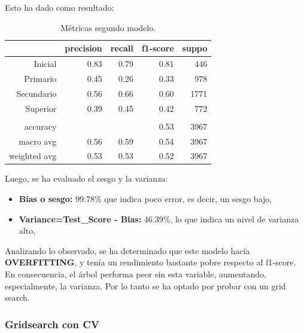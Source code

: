 \documentclass[a4paper]{article}
\begin{document}
            Esto ha dado como resultado:  

            \begin{table}[H]
                \centering
                \begin{tabular}{rrrrr}
                    \toprule
                    ~ & precision & recall & f1-score & suppo \\ \midrule
                    Inicial    & 0.83 & 0.79 & 0.81 & 446 \\
                    Primario   & 0.45 & 0.26 & 0.33 & 978 \\
                    Secundario & 0.56 & 0.66 & 0.60 & 1771 \\
                    Superior   & 0.39 & 0.45 & 0.42 & 772 \\
                    & & & & \\
                    accuracy & & & 0.53 & 3967 \\
                    macro avg & 0.56 & 0.59 & 0.54 & 3967 \\
                    weighted avg & 0.53 & 0.53 & 0.52 & 3967 \\
                    \bottomrule
                \end{tabular}
                \caption{Métricas segundo modelo.}
                \label{Second model metrics}
            \end{table}

            Luego, se ha evaluado el sesgo y la varianza:
            \begin{itemize}
                \item \textbf{Bias o sesgo:} 99.78\% que indica poco error, es decir, un sesgo bajo,
                \item \textbf{Variance=Test\_Score - Bias:} 46.39\%, lo que indica un nivel de varianza alto,
            \end{itemize}
            
            Analizando lo observado, se ha determinado que este modelo hacía \textbf{OVERFITTING}, y tenía un rendimiento bastante pobre respecto al f1-score. En consecuencia, el árbol performa peor sin esta variable, aumentando, especialmente, la varianza. Por lo tanto se ha optado por probar con un grid search.
        
        \subsubsection{Gridsearch con CV}
            
\end{document}
